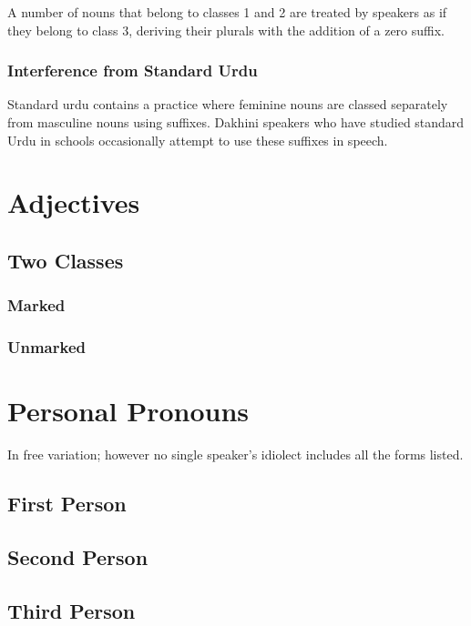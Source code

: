 \documentclass[a4paper]{article}
\begin{document}
A number of nouns that belong to classes 1 and 2 are treated by speakers as if they belong to class 3, deriving their plurals with the addition of a zero suffix.

\subsubsection{Interference from Standard Urdu}

Standard urdu contains a practice where feminine nouns are classed separately from masculine nouns using suffixes. Dakhini speakers who have studied standard Urdu in schools occasionally attempt to use these suffixes in speech.

\section{Adjectives}

\subsection{Two Classes}

\subsubsection{Marked}

\subsubsection{Unmarked}

\section{Personal Pronouns}

In free variation; however no single speaker's idiolect includes all the forms listed.

\subsection{First Person}

\subsection{Second Person}

\subsection{Third Person}
\end{document}
